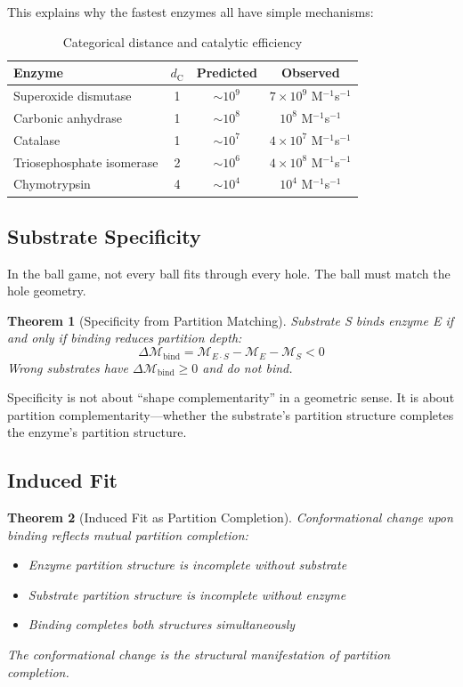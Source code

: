 \documentclass[twocolumn,10pt,a4paper]{article}
\newtheorem{theorem}{Theorem}[section]
\theoremstyle{definition}
\theoremstyle{remark}
\newcommand{\Depth}{\mathcal{M}}
\newcommand{\dC}{d_{\mathrm{C}}}
\begin{document}
This explains why the fastest enzymes all have simple mechanisms:

\begin{table}[h]
\centering
\caption{Categorical distance and catalytic efficiency}
\label{tab:efficiency}
\begin{tabular}{lccc}
\toprule
Enzyme & $\dC$ & Predicted & Observed \\
\midrule
Superoxide dismutase & 1 & $\sim 10^9$ & $7 \times 10^9$ M$^{-1}$s$^{-1}$ \\
Carbonic anhydrase & 1 & $\sim 10^8$ & $10^8$ M$^{-1}$s$^{-1}$ \\
Catalase & 1 & $\sim 10^7$ & $4 \times 10^7$ M$^{-1}$s$^{-1}$ \\
Triosephosphate isomerase & 2 & $\sim 10^6$ & $4 \times 10^8$ M$^{-1}$s$^{-1}$ \\
Chymotrypsin & 4 & $\sim 10^4$ & $10^4$ M$^{-1}$s$^{-1}$ \\
\bottomrule
\end{tabular}
\end{table}

\subsection{Substrate Specificity}

In the ball game, not every ball fits through every hole. The ball must match the hole geometry.

\begin{theorem}[Specificity from Partition Matching]
\label{thm:specificity}
Substrate S binds enzyme E if and only if binding reduces partition depth:
\begin{equation}
    \Delta\Depth_{\mathrm{bind}} = \Depth_{E \cdot S} - \Depth_E - \Depth_S < 0
\end{equation}
Wrong substrates have $\Delta\Depth_{\mathrm{bind}} \geq 0$ and do not bind.
\end{theorem}

Specificity is not about ``shape complementarity'' in a geometric sense. It is about partition complementarity---whether the substrate's partition structure completes the enzyme's partition structure.

\subsection{Induced Fit}

\begin{theorem}[Induced Fit as Partition Completion]
\label{thm:induced}
Conformational change upon binding reflects mutual partition completion:
\begin{itemize}
    \item Enzyme partition structure is incomplete without substrate
    \item Substrate partition structure is incomplete without enzyme
    \item Binding completes both structures simultaneously
\end{itemize}
The conformational change is the structural manifestation of partition completion.
\end{theorem}
\end{document}
